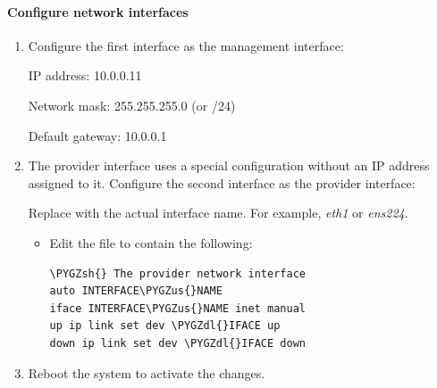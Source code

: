 \documentclass[letterpaper,10pt,english]{sphinxmanual}
\def\PYGZus{\char`\_}
\def\PYGZsh{\char`\#}
\def\PYGZdl{\char`\$}
\begin{document}
\paragraph{Configure network interfaces}
\label{_source/installation_guide/environment-networking-controller:configure-network-interfaces}\begin{enumerate}
\item {} 
Configure the first interface as the management interface:

IP address: 10.0.0.11

Network mask: 255.255.255.0 (or /24)

Default gateway: 10.0.0.1

\item {} 
The provider interface uses a special configuration without an IP
address assigned to it. Configure the second interface as the provider
interface:

Replace  with the actual interface name. For example,
\emph{eth1} or \emph{ens224}.
\begin{itemize}
\item {} 
Edit the  file to contain the following:

\begin{Verbatim}[commandchars=\\\{\}]
\PYGZsh{} The provider network interface
auto INTERFACE\PYGZus{}NAME
iface INTERFACE\PYGZus{}NAME inet manual
up ip link set dev \PYGZdl{}IFACE up
down ip link set dev \PYGZdl{}IFACE down
\end{Verbatim}

\end{itemize}

\item {} 
Reboot the system to activate the changes.

\end{enumerate}
\end{document}
